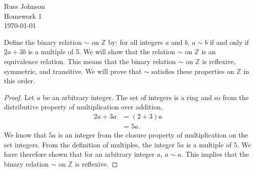 \documentclass[12pt]{article}
\begin{document}
\begin{flushright}
Russ Johnson\\
Homework 1\\
\today\\
\end{flushright}
Define the binary relation $\sim$ on $\mathbb{Z}$ by: for all integers $a$ and $b$, $a\sim b$ if and only if $2a+3b$ is a multiple of 5. We will show that the relation $\sim$ on $\mathbb{Z}$ is an equivalence relation. This means that the binary relation $\sim$ on $\mathbb{Z}$ is reflexive, symmetric, and transitive. We will prove that $\sim$ satisfies these properties on $\mathbb{Z}$ in this order.

\begin{proof}
Let $a$ be an arbitrary integer. The set of integers is a ring and so from the distributive property of multiplication over addition,
\begin{align*}
2a+3a &= (2+3)a \\
&= 5a.
\end{align*}
We know that $5a$ is an integer from the closure property of multiplication on the set integers. From the definition of multiples, the integer $5a$ is a multiple of 5. We have therefore shown that for an arbitrary integer $a$, $a\sim a$. This implies that the binary relation $\sim$ on $\mathbb{Z}$ is reflexive.
\end{proof}
\end{document}
